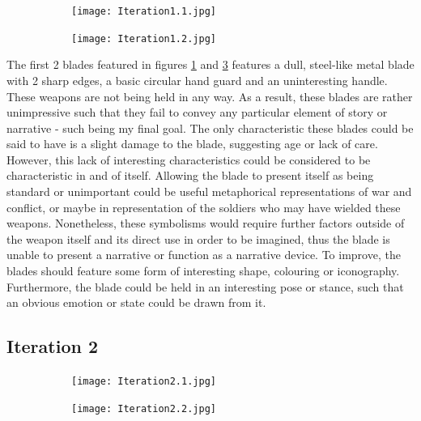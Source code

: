 \documentclass{article}
\begin{document}
\begin{figure}[h]
    \centering
    \caption{}
    \label{fig:Iteration1}
    \begin{subfigure}{0.49\textwidth}
        \texttt{[image: Iteration1.1.jpg]}
        \caption{}
        \label{fig:Iteration1.1}
    \end{subfigure}
    \begin{subfigure}{0.49\textwidth}
        \texttt{[image: Iteration1.2.jpg]}
        \caption{}
        \label{fig:Iteration1.2}
    \end{subfigure}
\end{figure}

The first 2 blades featured in figures \ref{fig:Iteration1.1} and \ref{fig:Iteration1.2} features a dull, steel-like metal blade with 2 sharp edges, a basic circular hand guard and an uninteresting handle. These weapons are not being held in any way. As a result, these blades are rather unimpressive such that they fail to convey any particular element of story or narrative - such being my final goal. The only characteristic these blades could be said to have is a slight damage to the blade, suggesting age or lack of care. However, this lack of interesting characteristics could be considered to be characteristic in and of itself. Allowing the blade to present itself as being standard or unimportant could be useful metaphorical representations of war and conflict, or maybe in representation of the soldiers who may have wielded these weapons. Nonetheless, these symbolisms would require further factors outside of the weapon itself and its direct use in order to be imagined, thus the blade is unable to present a narrative or function as a narrative device. To improve, the blades should feature some form of interesting shape, colouring or iconography. Furthermore, the blade could be held in an interesting pose or stance, such that an obvious emotion or state could be drawn from it.

\pagebreak

\subsection{Iteration 2} \label{Iteration2}

\begin{figure}[h]
    \centering
    \caption{}
    \label{fig:Iteration2}
    \begin{subfigure}{0.49\textwidth}
        \texttt{[image: Iteration2.1.jpg]}
        \caption{}
        \label{fig:Iteration2.1}
    \end{subfigure}
    \begin{subfigure}{0.49\textwidth}
        \texttt{[image: Iteration2.2.jpg]}
        \caption{}
        \label{fig:Iteration2.2}
    \end{subfigure}
\end{figure}
\end{document}
